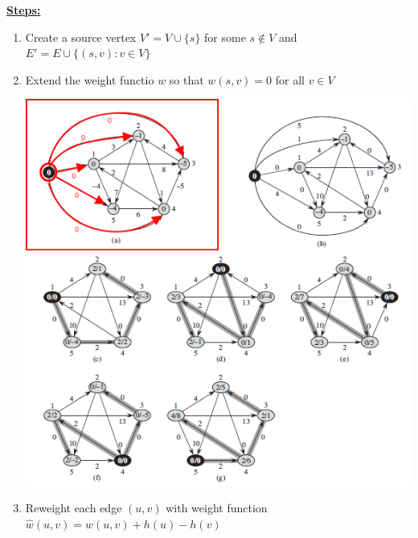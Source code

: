 \documentclass[12pt]{article}
\begin{document}
\begin{enumerate}[1.]
\begin{itemize}
        \bigskip

        \underline{\textbf{Steps:}}

        \begin{enumerate}[1.]
            \item Create a source vertex $V' = V \cup \{s\}$ for some $s \notin V$ and $E' = E \cup \{(s,v): v \in V\}$
            \item Extend the weight functio $w$ so that $w(s,v) = 0$ for all $v \in V$

            \begin{center}
            \includegraphics[width=\linewidth]{images/worksheet_4_solution_55.png}
            \end{center}

            \item Reweight each edge $(u,v)$ with weight function $\hat{w}(u,v) = w(u,v) + h(u) - h(v)$


\end{enumerate}
\end{itemize}
\end{enumerate}
\end{document}
